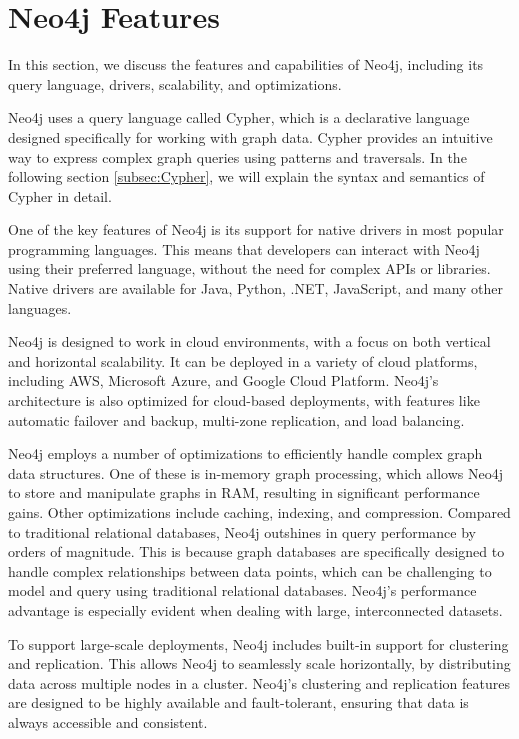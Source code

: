 
\section{Neo4j Features} \label{sec:features}

In this section, we discuss the features and capabilities of Neo4j, including its query language, drivers, scalability, and optimizations.

Neo4j uses a query language called Cypher, which is a declarative language designed specifically for working with graph data. Cypher provides an intuitive way to express complex graph queries using patterns and traversals. In the following section \ref{subsec:Cypher}, we will explain the syntax and semantics of Cypher in detail.

One of the key features of Neo4j is its support for native drivers in most popular programming languages. This means that developers can interact with Neo4j using their preferred language, without the need for complex APIs or libraries. Native drivers are available for Java, Python, .NET, JavaScript, and many other languages.

Neo4j is designed to work in cloud environments, with a focus on both vertical and horizontal scalability. It can be deployed in a variety of cloud platforms, including AWS, Microsoft Azure, and Google Cloud Platform. Neo4j's architecture is also optimized for cloud-based deployments, with features like automatic failover and backup, multi-zone replication, and load balancing.

Neo4j employs a number of optimizations to efficiently handle complex graph data structures. One of these is in-memory graph processing, which allows Neo4j to store and manipulate graphs in RAM, resulting in significant performance gains. Other optimizations include caching, indexing, and compression.
Compared to traditional relational databases, Neo4j outshines in query performance by orders of magnitude. This is because graph databases are specifically designed to handle complex relationships between data points, which can be challenging to model and query using traditional relational databases. Neo4j's performance advantage is especially evident when dealing with large, interconnected datasets.

To support large-scale deployments, Neo4j includes built-in support for clustering and replication. This allows Neo4j to seamlessly scale horizontally, by distributing data across multiple nodes in a cluster. Neo4j's clustering and replication features are designed to be highly available and fault-tolerant, ensuring that data is always accessible and consistent.

